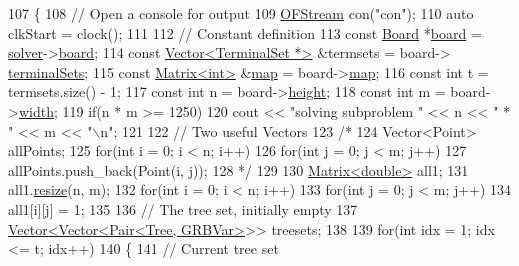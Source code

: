 \begin{DoxyCode}
107 \{
108     \textcolor{comment}{// Open a console for output}
109     \hyperlink{global_8h_a7ec5bb64a5a7c56f5600caebf1ac2b7e}{OFStream} con(\textcolor{stringliteral}{"con"});
110     \textcolor{keyword}{auto} clkStart = clock();
111     
112     \textcolor{comment}{// Constant definition}
113     \textcolor{keyword}{const} \hyperlink{classBoard}{Board} *\hyperlink{classes_8txt_ab2104b75e0965a7c5fc13208045d9b59}{board} = \hyperlink{classSolveStrategy_a94d43c47305176d0d3858697d3410443}{solver}->\hyperlink{classSolver_a8966a22c2f247addc8ce453d119bc54e}{board};
114     \textcolor{keyword}{const} \hyperlink{classVector}{Vector<TerminalSet *>} &termsets = board->
      \hyperlink{classBoard_a6683a9c042af7113f55c5bc1b9656b69}{terminalSets};
115     \textcolor{keyword}{const} \hyperlink{classMatrix}{Matrix<int>} &\hyperlink{classes_8txt_a0a12e395730487ab04f7f11cbc4d2132}{map} = board->\hyperlink{classBoard_a191ff45df9151b8fee0c32877f582165}{map};
116     \textcolor{keyword}{const} \textcolor{keywordtype}{int} t = termsets.size() - 1;
117     \textcolor{keyword}{const} \textcolor{keywordtype}{int} n = board->\hyperlink{classBoard_aa0cb8de0254520dc08dab5796643c8e5}{height};
118     \textcolor{keyword}{const} \textcolor{keywordtype}{int} m = board->\hyperlink{classBoard_a90a8efaa4736af25511ac948bdd27d6c}{width};
119     \textcolor{keywordflow}{if}(n * m >= 1250)
120         cout << \textcolor{stringliteral}{"solving subproblem "} << n << \textcolor{stringliteral}{" * "} << m << \textcolor{stringliteral}{"\(\backslash\)n"};
121     
122     \textcolor{comment}{// Two useful Vectors}
123     \textcolor{comment}{/*}
124 \textcolor{comment}{    Vector<Point> allPoints;}
125 \textcolor{comment}{    for(int i = 0; i < n; i++)}
126 \textcolor{comment}{        for(int j = 0; j < m; j++)}
127 \textcolor{comment}{            allPoints.push\_back(Point(i, j));}
128 \textcolor{comment}{    */}
129     
130     \hyperlink{classMatrix}{Matrix<double>} all1;
131     all1.\hyperlink{classMatrix_a15ce96c8af4c7a982c2c10b96f29cea1}{resize}(n, m);
132     \textcolor{keywordflow}{for}(\textcolor{keywordtype}{int} i = 0; i < n; i++)
133         \textcolor{keywordflow}{for}(\textcolor{keywordtype}{int} j = 0; j < m; j++)
134             all1[i][j] = 1;
135     
136     \textcolor{comment}{// The tree set, initially empty}
137     \hyperlink{classVector}{Vector<Vector<Pair<Tree, GRBVar>}>> treesets;
138     
139     \textcolor{keywordflow}{for}(\textcolor{keywordtype}{int} idx = 1; idx <= t; idx++)
140     \{
141         \textcolor{comment}{// Current tree set}

\end{DoxyCode}
